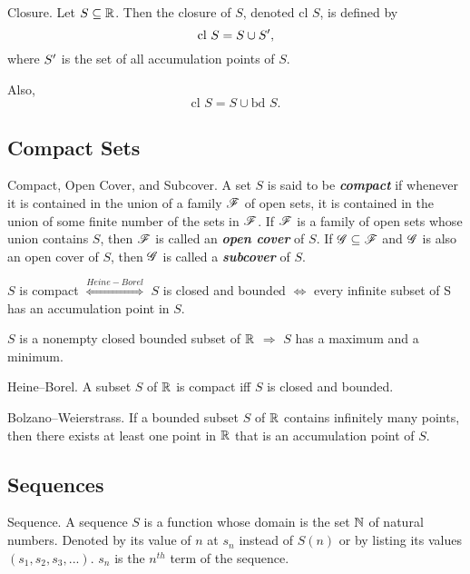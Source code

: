 \documentclass[12pt]{article}
\begin{document}
\begin{definition}{Closure.}
  Let $S \subseteq \mathbb{R}$. Then the closure of $S$, denoted $\text{cl } S$, is
  defined by $$\text{cl } S = S \cup S',$$ where $S'$ is the set of all
  accumulation points of $S$.

  Also, $$\text{cl } S = S \cup \text{bd } S.$$
\end{definition}

\subsection{Compact Sets}
\label{sec:org022bae4}
\begin{definition}{Compact, Open Cover, and Subcover.}
  A set $S$ is said to be \textit{\textbf{compact}} if whenever it is
  contained in the union of a family $\mathscr{F}$ of open sets, it is contained in
  the union of some finite number of the sets in $\mathscr{F}$. If $\mathscr{F}$ is a family of
  open sets whose union contains $S$, then $\mathscr{F}$ is called an
  \textit{\textbf{open cover}} of $S$. If $\mathscr{G} \subseteq \mathscr{F}$ and $\mathscr{G}$ is also an open
  cover of $S$, then $\mathscr{G}$ is called a \textit{\textbf{subcover}} of $S$.

  \begin{corollary}{}
      $S$ is compact $\overset{Heine-Borel}{\iff}$ $S$ is closed and bounded
      $\iff$ every infinite subset of S has an accumulation point in $S$.

      $S$ is a nonempty closed bounded subset of $\mathbb{R}$ $\Rightarrow$ $S$ has a maximum
      and a minimum.
  \end{corollary}
\end{definition}

\begin{definition}{Heine--Borel.}
  A subset $S$ of $\mathbb{R}$ is compact iff $S$ is closed and bounded.
\end{definition}

\begin{definition}{Bolzano--Weierstrass.}
  If a bounded subset $S$ of $\mathbb{R}$ contains infinitely many points, then there
  exists at least one point in $\mathbb{R}$ that is an accumulation point of $S$.
\end{definition}

\subsection{Sequences}
\label{sec:org2fa21a3}
\begin{definition}{Sequence.}
  A sequence $S$ is a function whose domain is the set $\mathbb{N}$ of natural
  numbers. Denoted by its value of $n$ at $s_n$ instead of $S(n)$ or by listing
  its values $(s_1, s_2, s_3, ...)$. $s_n$ is the $n^{th}$ term of the sequence.
\end{definition}
\end{document}
